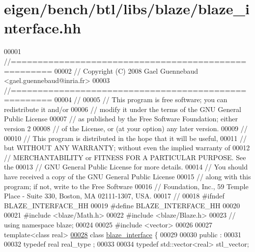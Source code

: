 \hypertarget{eigen_2bench_2btl_2libs_2blaze_2blaze__interface_8hh_source}{}\section{eigen/bench/btl/libs/blaze/blaze\+\_\+interface.hh}
\label{eigen_2bench_2btl_2libs_2blaze_2blaze__interface_8hh_source}

\begin{DoxyCode}
00001 \textcolor{comment}{//=====================================================}
00002 \textcolor{comment}{// Copyright (C) 2008 Gael Guennebaud <gael.guennebaud@inria.fr>}
00003 \textcolor{comment}{//=====================================================}
00004 \textcolor{comment}{//}
00005 \textcolor{comment}{// This program is free software; you can redistribute it and/or}
00006 \textcolor{comment}{// modify it under the terms of the GNU General Public License}
00007 \textcolor{comment}{// as published by the Free Software Foundation; either version 2}
00008 \textcolor{comment}{// of the License, or (at your option) any later version.}
00009 \textcolor{comment}{//}
00010 \textcolor{comment}{// This program is distributed in the hope that it will be useful,}
00011 \textcolor{comment}{// but WITHOUT ANY WARRANTY; without even the implied warranty of}
00012 \textcolor{comment}{// MERCHANTABILITY or FITNESS FOR A PARTICULAR PURPOSE.  See the}
00013 \textcolor{comment}{// GNU General Public License for more details.}
00014 \textcolor{comment}{// You should have received a copy of the GNU General Public License}
00015 \textcolor{comment}{// along with this program; if not, write to the Free Software}
00016 \textcolor{comment}{// Foundation, Inc., 59 Temple Place - Suite 330, Boston, MA  02111-1307, USA.}
00017 \textcolor{comment}{//}
00018 \textcolor{preprocessor}{#ifndef BLAZE\_INTERFACE\_HH}
00019 \textcolor{preprocessor}{#define BLAZE\_INTERFACE\_HH}
00020 
00021 \textcolor{preprocessor}{#include <blaze/Math.h>}
00022 \textcolor{preprocessor}{#include <blaze/Blaze.h>}
00023 \textcolor{comment}{// using namespace blaze;}
00024 
00025 \textcolor{preprocessor}{#include <vector>}
00026 
00027 \textcolor{keyword}{template}<\textcolor{keyword}{class} real>
\hyperlink{classblaze__interface}{00028} \textcolor{keyword}{class }\hyperlink{classblaze__interface}{blaze\_interface} \{
00029 
00030 public :
00031 
00032   \textcolor{keyword}{typedef} real real\_type ;
00033 
00034   \textcolor{keyword}{typedef} std::vector<real>        stl\_vector;

\end{DoxyCode}
